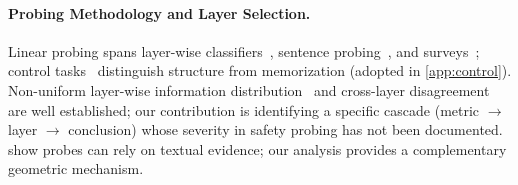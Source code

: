 \paragraph{Probing Methodology and Layer Selection.}
Linear probing spans layer-wise classifiers~\cite{alain2017understanding}, sentence probing~\cite{conneau2018probing}, and surveys~\cite{belinkov2022probing,rogers2020primer}; control tasks~\cite{hewitt2019control} distinguish structure from memorization (adopted in \cref{app:control}). Non-uniform layer-wise information distribution~\cite{tenney2019bert,marks2024geometry} and cross-layer disagreement~\cite{kaya2019shallow,zhou2020bert} are well established; our contribution is identifying a specific cascade (metric $\to$ layer $\to$ conclusion) whose severity in safety probing has not been documented. \citet{boxo2025linear_probes} show probes can rely on textual evidence; our analysis provides a complementary geometric mechanism.
